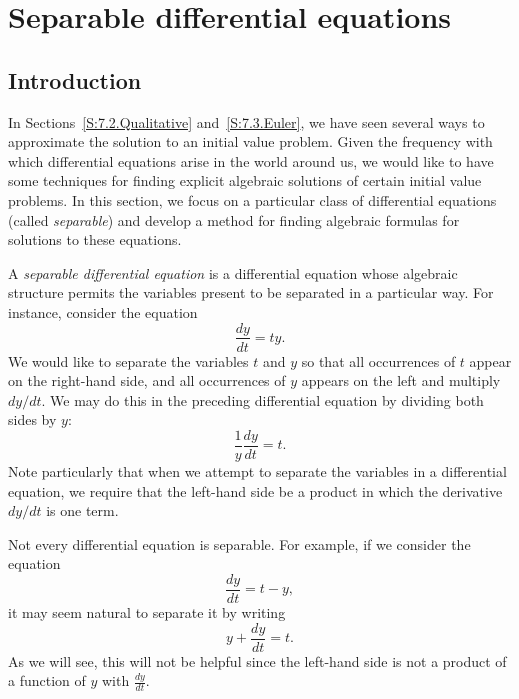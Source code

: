 \section{Separable differential equations} \label{S:7.4.Separable}

\vspace*{-14 pt}


\subsection*{Introduction}

In Sections~\ref{S:7.2.Qualitative} and~\ref{S:7.3.Euler}, we have seen several ways to approximate the solution to
an initial value problem.   Given the frequency with which differential equations arise in the world around us, we would like to have some techniques
for finding explicit algebraic solutions of certain initial value
problems.  In this section, we focus on a particular class of differential
equations (called {\em separable}) and develop a method for finding
algebraic formulas for solutions to these equations.

A {\em separable differential equation} is a differential equation whose algebraic structure permits the variables present to be separated in a particular way.  For instance, consider the equation
$$
\frac{dy}{dt} = ty.
$$
We would like to separate the variables $t$ and $y$ so that all
occurrences of $t$ appear on the right-hand side, and all occurrences
of $y$ appears on the left and multiply $dy/dt$.  We may do this in the preceding differential equation by dividing both sides by
$y$:
$$
\frac1y\frac{dy}{dt} = t.
$$
Note particularly that when we attempt to separate the variables in a differential equation, we require that the left-hand side be a product in which the derivative $dy/dt$ is one term.  

Not every differential equation is separable.  For example, if we consider the
equation
$$
\frac{dy}{dt} = t-y,
$$
it may seem natural to separate it by writing
$$
y + \frac{dy}{dt} = t.
$$
As we will see, this will not be helpful since the left-hand side is
not a product of a function of $y$ with $\frac{dy}{dt}$.

